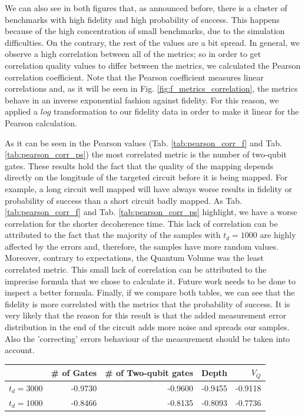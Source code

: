 We can also see in both figures that, as announced before, there is a cluster of benchmarks with high fidelity and high probability of success.
This happens because of the high concentration of small benchmarks, due to the simulation difficulties.
On the contrary, the rest of the values are a bit spread.
In general, we observe a high correlation between all of the metrics; so in order to get correlation quality values to differ between the metrics, we calculated the Pearson correlation coefficient.
Note that the Pearson coefficient measures linear correlations and, as it will be seen in Fig. \ref{fig:f_metrics_correlation}, the metrics behave in an inverse exponential fashion against fidelity.
For this reason, we applied a \(log\) transformation to our fidelity data in order to make it linear for the Pearson calculation.


As it can be seen in the Pearson values (Tab. \ref{tab:pearson_corr_f} and Tab. \ref{tab:pearson_corr_ps}) the most correlated metric is the number of two-qubit gates.
These results hold the fact that the quality of the mapping depends directly on the longitude of the targeted circuit before it is being mapped.
For example, a long circuit well mapped will have always worse results in fidelity or probability of success than a short circuit badly mapped.
As Tab. \ref{tab:pearson_corr_f} and Tab. \ref{tab:pearson_corr_ps} highlight, we have a worse correlation for the shorter decoherence time.
This lack of correlation can be attributed to the fact that the majority of the samples with \(t_d = 1000\) are highly affected by the errors and, therefore, the samples have more random values.
Moreover, contrary to expectations, the Quantum Volume was the least correlated metric.
This small lack of correlation can be attributed to the imprecise formula that we chose to calculate it.
Future work needs to be done to inspect a better formula.
Finally, if we compare both tables, we can see that the fidelity is more correlated with the metrics that the probability of success.
It is very likely that the reason for this result is that the added measurement error distribution in the end of the circuit adds more noise and spreads our samples.
Also the 'correcting' errors behaviour of the measurement should be taken into account.

\begin{center}
\begin{tabular}{lrrrr}
\hline
 & \# of Gates & \# of Two-qubit gates & Depth & \(V_Q\)\\
\hline
\(t_d = 3000\) & -0.9730 & -0.9600 & -0.9455 & -0.9118\\
\(t_d = 1000\) & -0.8466 & -0.8135 & -0.8093 & -0.7736\\
\hline
\end{tabular}
\end{center}

